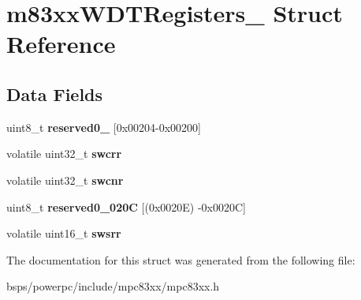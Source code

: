 \hypertarget{structm83xxWDTRegisters__}{}\section{m83xx\+W\+D\+T\+Registers\+\_\+ Struct Reference}
\label{structm83xxWDTRegisters__}
\subsection*{Data Fields}
\begin{DoxyCompactItemize}
\item 
\mbox{\label{structm83xxWDTRegisters___a78895b9a8ef5986b0062633a9b08f6da}} 
uint8\+\_\+t {\bfseries reserved0\+\_} \mbox{[}0x00204-\/0x00200\mbox{]}
\item 
\mbox{\label{structm83xxWDTRegisters___a9245ed128848d61099eca7347aed93f3}} 
volatile uint32\+\_\+t {\bfseries swcrr}
\item 
\mbox{\label{structm83xxWDTRegisters___a83e8e086ec15b756a9a9439f790b9ff2}} 
volatile uint32\+\_\+t {\bfseries swcnr}
\item 
\mbox{\label{structm83xxWDTRegisters___aa6452f7e63a8f395e967ef065334a432}} 
uint8\+\_\+t {\bfseries reserved0\+\_\+020C} \mbox{[}(0x0020\+E) -\/0x0020\+C\mbox{]}
\item 
\mbox{\label{structm83xxWDTRegisters___a874b9fe8cd54d220954496dd5cf723d7}} 
volatile uint16\+\_\+t {\bfseries swsrr}
\end{DoxyCompactItemize}


The documentation for this struct was generated from the following file\+:\begin{DoxyCompactItemize}
\item 
bsps/powerpc/include/mpc83xx/mpc83xx.\+h\end{DoxyCompactItemize}
